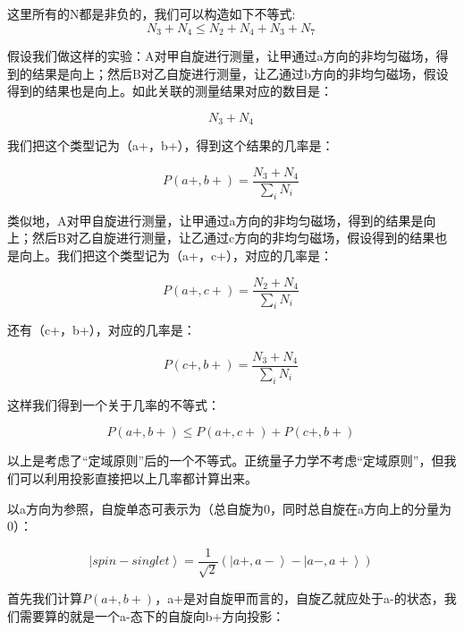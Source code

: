 这里所有的N都是非负的，我们可以构造如下不等式:
\begin{equation}
N_3 + N_4 \le N_2 + N_4 + N_3 + N_7~
\end{equation}

假设我们做这样的实验：A对甲自旋进行测量，让甲通过a方向的非均匀磁场，得到的结果是向上；然后B对乙自旋进行测量，让乙通过b方向的非均匀磁场，假设得到的结果也是向上。如此关联的测量结果对应的数目是：

\begin{equation}
N_3 + N_4~
\end{equation}

我们把这个类型记为（a+，b+），得到这个结果的几率是：

\begin{equation}
P(a+, b+) = \frac{N_3 + N_4}{ \sum\limits_i N_i}~
\end{equation}

类似地，A对甲自旋进行测量，让甲通过a方向的非均匀磁场，得到的结果是向上；然后B对乙自旋进行测量，让乙通过c方向的非均匀磁场，假设得到的结果也是向上。我们把这个类型记为（a+，c+），对应的几率是：

\begin{equation}
P(a+, c+) = \frac{N_2 + N_4}{ \sum\limits_i N_i}~
\end{equation}

还有（c+，b+），对应的几率是：

\begin{equation}
P(c+, b+) = \frac{N_3 + N_4}{ \sum\limits_i N_i}~
\end{equation}

这样我们得到一个关于几率的不等式：

\begin{equation}
P(a+, b+) \le P(a+, c+) + P(c+, b+)~
\end{equation}

以上是考虑了“定域原则”后的一个不等式。正统量子力学不考虑“定域原则”，但我们可以利用投影直接把以上几率都计算出来。

以a方向为参照，自旋单态可表示为（总自旋为0，同时总自旋在a方向上的分量为0）：

\begin{equation}
\left| spin-singlet \right\rangle = \frac{1}{\sqrt{2}}\left( \left|{a+, a- }  \right\rangle  - \left|{a-, a+ }  \right\rangle \right)~
\end{equation}

首先我们计算$P(a+, b+)$，a+是对自旋甲而言的，自旋乙就应处于a-的状态，我们需要算的就是一个a-态下的自旋向b+方向投影：

